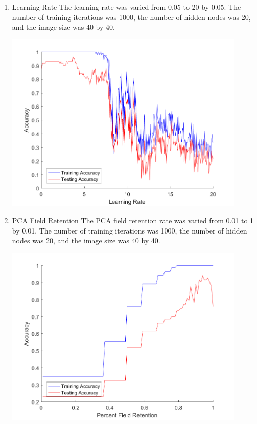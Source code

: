 \documentclass[12pt]{article}
\begin{document}
\begin{enumerate}
\begin{center}
  \end{center}
  \item Learning Rate
  The learning rate was varied from 0.05 to 20 by 0.05. The number of training iterations was 1000, the number of hidden nodes was 20, and the image size was 40 by 40. 
  \begin{center}
    \includegraphics[width=115mm]{./accuracy_imgs/learning_rate_empirical.png}
    \label{fig:img_size}
  \end{center}
  \item PCA Field Retention
  The PCA field retention rate was varied from 0.01 to 1 by 0.01. The number of training iterations was 1000, the number of hidden nodes was 20, and the image size was 40 by 40. 
  \begin{center}
    \includegraphics[width=115mm]{./accuracy_imgs/percent_field_retention_empirical.png}
    \label{fig:img_size}
  \end{center}
\end{enumerate}
\end{document}
